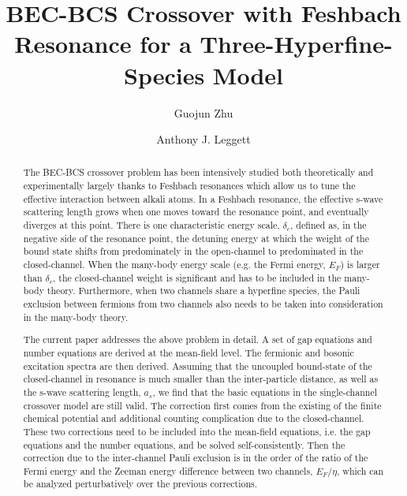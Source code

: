 \documentclass[reprint,pra]{revtex4-1}
\begin{document}
\title{BEC-BCS Crossover with Feshbach Resonance for a Three-Hyperfine-Species Model}
\author{Guojun Zhu}
\author{Anthony J. Leggett}

%
\begin{abstract}
The BEC-BCS crossover problem has been intensively studied both theoretically and experimentally largely thanks to  Feshbach resonances which allow us to tune the effective interaction between alkali atoms.  In a Feshbach resonance, the effective s-wave scattering length grows when one moves toward the resonance point, and eventually diverges at this point.  There is one characteristic energy scale, $\delta_c$, defined as, in the negative side of the resonance point, the detuning energy at which the weight of the bound state shifts from predominately in the open-channel to predominated in the closed-channel.  When the many-body energy scale (e.g. the Fermi energy, $E_{F}$) is larger than $\delta_c$, the closed-channel weight is significant and has to be included in the many-body theory.  Furthermore, when two channels share a hyperfine species, the Pauli exclusion between fermions from two channels also needs to be taken into consideration in the many-body theory.  

The current  paper addresses the above problem in detail. A set of gap equations and number equations  are derived at the mean-field level.  The fermionic and bosonic excitation spectra are then derived. Assuming that the uncoupled bound-state of the closed-channel in resonance is much smaller than the inter-particle distance, as well as the s-wave scattering length, $a_s$, we find that  the basic equations in the single-channel crossover model are still valid. The correction first comes from the existing of the finite chemical potential and additional counting complication due to the closed-channel.  These two corrections need to be included into the mean-field equations, i.e. the gap equations and the number equations, and be solved self-consistently.  Then the correction due to the inter-channel Pauli exclusion is in the  order of the ratio of the Fermi energy and the Zeeman energy difference between two channels, $E_F/\eta$, which can be analyzed perturbatively over the previous corrections.  
\end{abstract}
\maketitle
\end{document}
